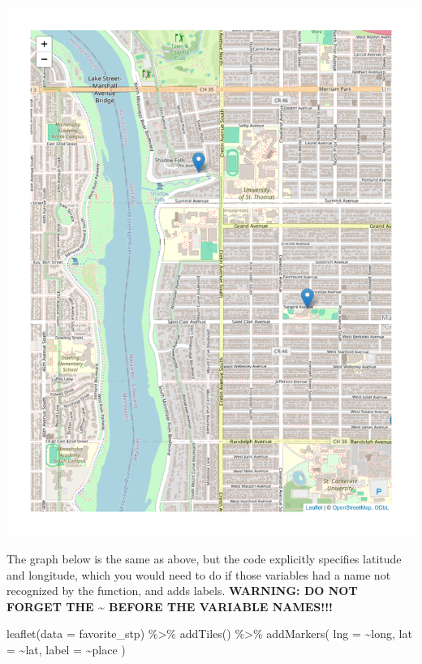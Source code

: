 \documentclass[
  letterpaper,
  DIV=11,
  numbers=noendperiod]{scrreprt}
\newenvironment{Shaded}{\begin{snugshade}}{\end{snugshade}}
\newcommand{\AttributeTok}[1]{\textcolor[rgb]{0.40,0.45,0.13}{#1}}
\newcommand{\FunctionTok}[1]{\textcolor[rgb]{0.28,0.35,0.67}{#1}}
\newcommand{\NormalTok}[1]{\textcolor[rgb]{0.00,0.23,0.31}{#1}}
\newcommand{\SpecialCharTok}[1]{\textcolor[rgb]{0.37,0.37,0.37}{#1}}
\begin{document}
\includegraphics{src/06-Spatial_Viz_files/figure-pdf/unnamed-chunk-23-1.pdf}

The graph below is the same as above, but the code explicitly specifies
latitude and longitude, which you would need to do if those variables
had a name not recognized by the function, and adds labels.
\textbf{WARNING: DO NOT FORGET THE \textasciitilde{} BEFORE THE VARIABLE
NAMES!!!}

\begin{Shaded}
\begin{Highlighting}[]
\FunctionTok{leaflet}\NormalTok{(}\AttributeTok{data =}\NormalTok{ favorite\_stp) }\SpecialCharTok{\%\textgreater{}\%}
  \FunctionTok{addTiles}\NormalTok{() }\SpecialCharTok{\%\textgreater{}\%}
  \FunctionTok{addMarkers}\NormalTok{(}
    \AttributeTok{lng =} \SpecialCharTok{\textasciitilde{}}\NormalTok{long,}
    \AttributeTok{lat =} \SpecialCharTok{\textasciitilde{}}\NormalTok{lat,}
    \AttributeTok{label =} \SpecialCharTok{\textasciitilde{}}\NormalTok{place}
\NormalTok{  )}
\end{Highlighting}
\end{Shaded}
\end{document}
